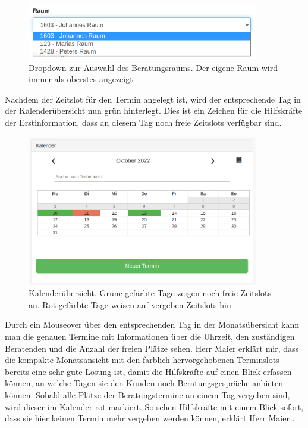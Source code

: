 \documentclass[12pt]{article}
\newcommand{\ipName}{Herr Maier }
\begin{document}
\begin{figure}[h]
    \caption{Dropdown zur Auswahl des Beratungsraums. Der eigene Raum wird immer als oberstes angezeigt}
    \centering
    \includegraphics[width=0.9\textwidth]{screen_old_roomdropdown.png}
\end{figure}

Nachdem der Zeitslot für den Termin angelegt ist, wird der entsprechende Tag in
der Kalenderübersicht nun grün hinterlegt. Dies ist ein Zeichen für die
Hilfskräfte der Erstinformation, dass an diesem Tag noch freie Zeitslots
verfügbar sind.

\begin{figure}[h]
    \caption{Kalenderübersicht. Grüne gefärbte Tage zeigen noch freie Zeitslots an. Rot gefärbte Tage weisen auf vergeben Zeitslots hin}
    \centering
    \includegraphics[width=0.9\textwidth]{screen_old_module.png}
\end{figure}

Durch ein Mouseover über den entsprechenden Tag in der Monatsübersicht kann man
die genauen Termine mit Informationen über die Uhrzeit, den zuständigen
Beratenden und die Anzahl der freien Plätze sehen. \ipName erklärt mir, dass
die kompakte Monatsansicht mit den farblich hervorgehobenen Terminslots bereits
eine sehr gute Lösung ist, damit die Hilfskräfte auf einen Blick erfassen
können, an welche Tagen sie den Kunden noch Beratungsgespräche anbieten können.
Sobald alle Plätze der Beratungstermine an einem Tag vergeben sind, wird dieser
im Kalender rot markiert. \glqq So sehen Hilfskräfte mit einem Blick sofort,
dass sie hier keinen Termin mehr vergeben werden können\grqq, erklärt \ipName
\cite{claves}.
\end{document}
